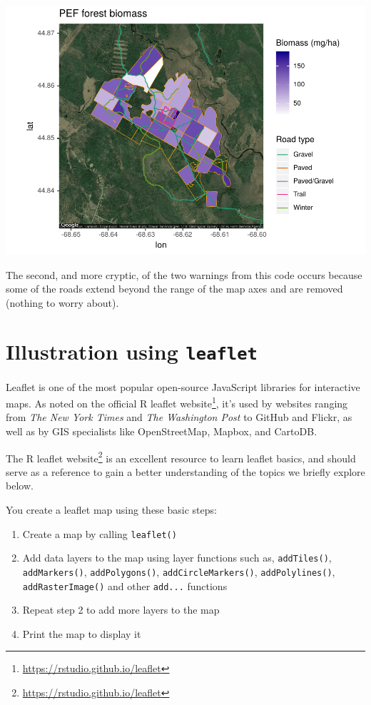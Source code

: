 \documentclass[
]{krantz}
\providecommand{\tightlist}{%
  \setlength{\itemsep}{0pt}\setlength{\parskip}{0pt}}
\renewcommand{\href}[2]{#2\footnote{\url{#1}}}
\begin{document}
\includegraphics{bookdown_files/figure-latex/unnamed-chunk-209-1.pdf}

The second, and more cryptic, of the two warnings from this code occurs because some of the roads extend beyond the range of the map axes and are removed (nothing to worry about).

\hypertarget{illustration-using-leaflet}{%
\section{\texorpdfstring{Illustration using \texttt{leaflet}}{Illustration using leaflet}}\label{illustration-using-leaflet}}

Leaflet is one of the most popular open-source JavaScript libraries for interactive maps. As noted on the official \href{https://rstudio.github.io/leaflet}{R leaflet website}, it's used by websites ranging from \emph{The New York Times} and \emph{The Washington Post} to GitHub and Flickr, as well as by GIS specialists like OpenStreetMap, Mapbox, and CartoDB.

The \href{https://rstudio.github.io/leaflet}{R leaflet website} is an excellent resource to learn leaflet basics, and should serve as a reference to gain a better understanding of the topics we briefly explore below.

You create a leaflet map using these basic steps:

\begin{enumerate}
\def\labelenumi{\arabic{enumi}.}
\tightlist
\item
  Create a map by calling \texttt{leaflet()}
\item
  Add data layers to the map using layer functions such as, \texttt{addTiles()}, \texttt{addMarkers()}, \texttt{addPolygons()}, \texttt{addCircleMarkers()}, \texttt{addPolylines()}, \texttt{addRasterImage()} and other \texttt{add...} functions
\item
  Repeat step 2 to add more layers to the map
\item
  Print the map to display it
\end{enumerate}
\end{document}
